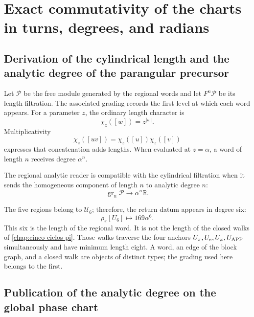 \section{Exact commutativity of the charts in turns, degrees, and radians}
\label{sec:s102:c38:5}

\subsection{Derivation of the cylindrical length and the analytic degree of the parangular precursor}
\label{sec:s102:c38:5:1}


Let \(\mathcal P\) be the free module generated by the regional words and
let \(F^n\mathcal P\) be its length filtration. The associated grading
records the first level at which each word appears. For a parameter
\(z\), the ordinary length character is
\[
\chi_z([w])=z^{|w|}.
\]
Multiplicativity
\[
\chi_z([uv])=\chi_z([u])\chi_z([v])
\]
expresses that concatenation adds lengths. When evaluated at
\(z=\alpha\), a word of length \(n\) receives degree \(\alpha^n\).

\begin{definition}
\label{p3-83-c30-s1:def:compatibilidad-grado}
The regional analytic reader is compatible with the cylindrical filtration
when it sends the homogeneous component of length \(n\) to analytic degree
\(n\):
\[
\operatorname{gr}_n\mathcal P\longrightarrow
\alpha^n\mathbb R.
\]
\end{definition}

The five regions belong to \(\mathcal U_6\); therefore, the return datum
appears in degree six:
\[
\rho_\pi[U_6]\longmapsto169\alpha^6.
\]
This six is the length of the regional word. It is not the length of the
closed walks of \cref{chap:cinco-ciclos-pi}. Those walks traverse
the four anchors
\(U_\pi,U_e,U_\varphi,U_{\rm APP}\) simultaneously and have minimum length eight. A
word, an edge of the block graph, and a closed walk are objects of
distinct types; the grading used here belongs to the first.

\subsection{Publication of the analytic degree on the global phase chart}
\label{sec:s102:c38:5:2}

